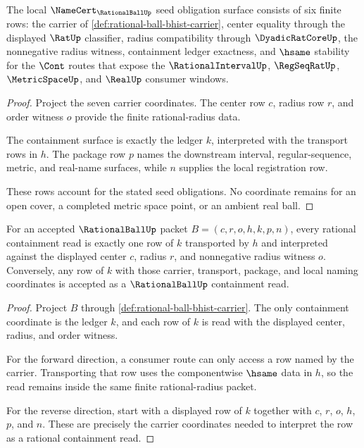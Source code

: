 \begin{theorem}
\label{thm:rational-ball-namecert-obligations}
The local $\NameCert_{\RationalBallUp}$ seed obligation surface consists of
six finite rows: the carrier of
\autoref{def:rational-ball-bhist-carrier}, center equality through the
displayed $\RatUp$ classifier, radius compatibility through
$\DyadicRatCoreUp$, the nonnegative radius witness, containment ledger
exactness, and $\hsame$ stability for the $\Cont$ routes that expose the
$\RationalIntervalUp$, $\RegSeqRatUp$, $\MetricSpaceUp$, and $\RealUp$
consumer windows.
\end{theorem}
\begin{proof}
Project the seven carrier coordinates. The center row $c$, radius row $r$,
and order witness $o$ provide the finite rational-radius data.

The containment surface is exactly the ledger $k$, interpreted with the
transport rows in $h$. The package row $p$ names the downstream interval,
regular-sequence, metric, and real-name surfaces, while $n$ supplies the local
registration row.

These rows account for the stated seed obligations. No coordinate remains for
an open cover, a completed metric space point, or an ambient real ball.
\end{proof}

\begin{theorem}
\label{thm:rational-ball-containment-exactness}
For an accepted $\RationalBallUp$ packet
$B=(c,r,o,h,k,p,n)$, every rational containment read is exactly one row of
$k$ transported by $h$ and interpreted against the displayed center $c$,
radius $r$, and nonnegative radius witness $o$. Conversely, any row of $k$
with those carrier, transport, package, and local naming coordinates is
accepted as a $\RationalBallUp$ containment read.
\end{theorem}
\begin{proof}
Project $B$ through \autoref{def:rational-ball-bhist-carrier}. The only
containment coordinate is the ledger $k$, and each row of $k$ is read with
the displayed center, radius, and order witness.

For the forward direction, a consumer route can only access a row named by
the carrier. Transporting that row uses the componentwise $\hsame$ data in
$h$, so the read remains inside the same finite rational-radius packet.

For the reverse direction, start with a displayed row of $k$ together with
$c$, $r$, $o$, $h$, $p$, and $n$. These are precisely the carrier coordinates
needed to interpret the row as a rational containment read.
\end{proof}


